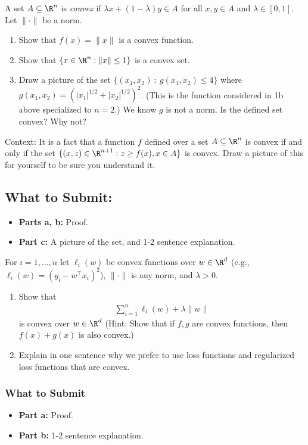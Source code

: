 \documentclass{article}
\begin{document}
\begin{bprob}
    A set $A \subseteq \R^n$ is \emph{convex} if $\lambda x + (1-\lambda) y \in A$ for all $x,y\in A$ and $\lambda \in [0,1]$. Let $\| \cdot \|$ be a norm.
    \begin{enumerate}
        \item {} Show that $f(x) = \| x \|$ is a convex function.
        \item {} Show that $\{ x \in \R^n : \|x\| \leq 1\}$ is a convex set.
        \item {} Draw a picture of the set $\{ (x_1,x_2) ~: ~ g(x_1,x_2) \le 4 \}$
        where $g(x_1, x_2)  = \left( |x_1|^{1/2} + |x_2|^{1/2}\right)^2$. (This is the function considered in 1b above specialized to $n=2$.) We know $g$ is not a norm. Is the defined set convex? Why not?
    \end{enumerate}
    Context: It is a fact that a function $f$ defined over a set $A \subseteq \R^n$ is convex if and only if the set $\{ (x, z) \in \R^{n+1} : z \geq f(x), x \in A \}$ is convex. Draw a picture of this for yourself to be sure you understand it.

    \subsection*{What to Submit:}
    \begin{itemize}
        \item \textbf{Parts a, b:} Proof.
        \item \textbf{Part c:} A picture of the set, and 1-2 sentence explanation.
    \end{itemize}
\end{bprob}

\begin{bprob}
    For $i=1,\dots,n$ let $\ell_i(w)$ be convex functions over $w \in \R^d$ (e.g., $\ell_i(w) = (y_i - w^\top x_i)^2$), $\| \cdot \|$ is any norm, and $\lambda >0$. 
    \begin{enumerate}
        \item {} Show that 
        \begin{align*}
            \sum_{i=1}^n \ell_i(w) + \lambda \| w \|
        \end{align*}
        is convex over $w\in \R^d$ (Hint: Show that if $f,g$ are convex functions, then $f(x) + g(x)$ is also convex.) 
        \item {} Explain in one sentence why we prefer to use loss functions and regularized loss functions that are convex.
    \end{enumerate}

    \subsubsection*{What to Submit}
    \begin{itemize}
        \item \textbf{Part a:} Proof.
        \item \textbf{Part b:} 1-2 sentence explanation.
    \end{itemize}
\end{bprob}
\end{document}

